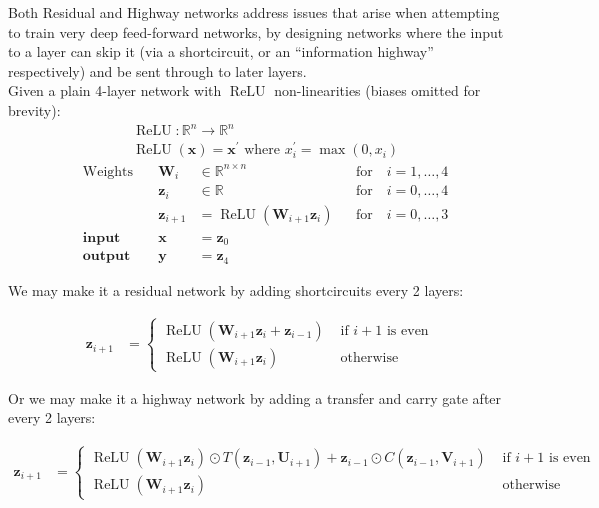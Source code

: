 Both Residual and Highway networks\cite{DBLP:journals/corr/SrivastavaGS15a} address issues that arise when attempting to train very deep feed-forward networks, by designing networks where the input to a layer can skip it (via a shortcircuit, or an ``information highway'' respectively) and be sent through to later layers.\\[1em]

Given a plain 4-layer network with $\operatorname{ReLU}$ non-linearities (biases omitted for brevity):
\begin{align*}
  &\operatorname{ReLU} : \mathbb{R}^n\to\mathbb{R}^n\\
  &\operatorname{ReLU}(\mathbf{x}) = \mathbf{x}^\prime\text{ where }x^\prime_i = \max(0,x_i)
\end{align*}
\begin{align*}
  &\text{Weights}\quad&\mathbf{W}_i & \in\mathbb{R}^{n\times n} && \text{for}\quad i = 1,\ldots,4\\
  &&\mathbf{z}_i & \in\mathbb{R} &&\text{for}\quad i = 0,\ldots,4\\
  &&\mathbf{z}_{i+1} & = \operatorname{ReLU}(\mathbf{W}_{i+1}\mathbf{z}_i) &&\text{for}\quad i = 0,\ldots,3\\
  &\textbf{input}\quad&\mathbf{x} & = \mathbf{z}_0\\
  &\textbf{output}\quad&\mathbf{y} & = \mathbf{z}_4
\end{align*}

We may make it a residual network by adding shortcircuits every 2 layers:

\begin{align*}
  \mathbf{z}_{i+1} & =
  \begin{cases}
    \operatorname{ReLU}(\mathbf{W}_{i+1}\mathbf{z}_i + \mathbf{z}_{i-1})
    & \text{ if $i+1$ is even}\\
    \operatorname{ReLU}(\mathbf{W}_{i+1}\mathbf{z}_i)
    & \text{ otherwise}
  \end{cases}
\end{align*}

Or we may make it a highway network by adding a transfer and carry gate after every 2 layers:

\begin{align*}
  \mathbf{z}_{i+1} & =
  \begin{cases}
    \operatorname{ReLU}(\mathbf{W}_{i+1}\mathbf{z}_i)\odot T(\mathbf{z}_{i-1},\mathbf{U}_{i+1})
    +\mathbf{z}_{i-1}\odot C(\mathbf{z}_{i-1},\mathbf{V}_{i+1})
    & \text{ if $i+1$ is even}\\
    \operatorname{ReLU}(\mathbf{W}_{i+1}\mathbf{z}_i)
    & \text{ otherwise}
  \end{cases}
\end{align*}

